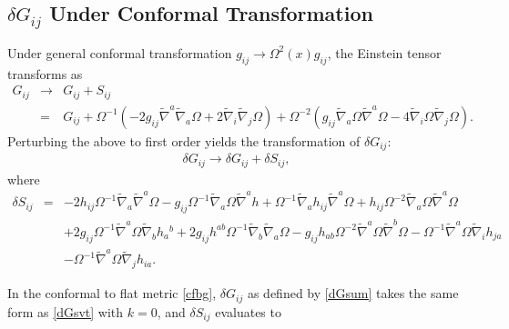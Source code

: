 \documentclass[10pt,letterpaper]{article}
\numberwithin{equation}{section}
\begin{document}
\begin{appendices}
\section{$\delta G_{ij}$ Under Conformal Transformation}
Under general conformal transformation $g_{ij}\to \Omega^2(x)g_{ij}$, the  Einstein tensor transforms as
\begin{eqnarray}
G_{ij} &\to& G_{ij} + S_{ij}
\nonumber\\
&=& G_{ij} +
\Omega^{-1}\left( -2g_{ij}\tilde\nabla^a \tilde\nabla_a \Omega + 2\tilde\nabla_i\tilde \nabla_j \Omega\right) +
\Omega^{-2}\left( g_{ij} \tilde\nabla_a \Omega \tilde\nabla^a \Omega - 4\tilde \nabla_i \Omega \tilde\nabla_j \Omega\right).
\end{eqnarray}
Perturbing the above to first order yields the transformation of $\delta G_{ij}$:
\begin{eqnarray}
\delta G_{ij} \to \delta G_{ij} + \delta S_{ij},
\label{dGsum}
\end{eqnarray}
where
\begin{eqnarray}
\delta S_{ij}&=&-2 h_{ij} \Omega^{-1} \tilde{\nabla}_{a}\tilde{\nabla}^{a}\Omega
 -  g_{ij} \Omega^{-1} \tilde{\nabla}_{a}\Omega \tilde{\nabla}^{a}h
 + \Omega^{-1} \tilde{\nabla}_{a}h_{ij} \tilde{\nabla}^{a}\Omega
 + h_{ij} \Omega^{-2} \tilde{\nabla}_{a}\Omega \tilde{\nabla}^{a}\Omega\nonumber\\
&& + 2 g_{ij} \Omega^{-1} \tilde{\nabla}^{a}\Omega \tilde{\nabla}_{b}h_{a}{}^{b}
 + 2 g_{ij} h^{ab} \Omega^{-1} \tilde{\nabla}_{b}\tilde{\nabla}_{a}\Omega
 -  g_{ij} h_{ab} \Omega^{-2} \tilde{\nabla}^{a}\Omega \tilde{\nabla}^{b}\Omega
 -  \Omega^{-1} \tilde{\nabla}^{a}\Omega \tilde{\nabla}_{i}h_{ja}\nonumber\\
&&-  \Omega^{-1} \tilde{\nabla}^{a}\Omega \tilde{\nabla}_{j}h_{ia}.
\end{eqnarray}

In the conformal to flat metric \eqref{cfbg}, $\delta G_{ij}$ as defined by \eqref{dGsum} takes the same form as \eqref{dGsvt} with $k=0$,  and $\delta S_{ij}$ evaluates to


\end{appendices}
\end{document}
